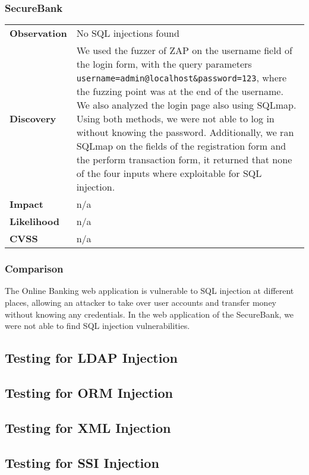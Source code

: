 \subsubsection*{SecureBank}

\begin{tabular}{l|p{10cm}}

\textbf{Observation} & No SQL injections found \\
\textbf{Discovery} & We used the fuzzer of ZAP on the username field of the login form, with the query parameters \texttt{username=admin@localhost\&password=123}, where the fuzzing point was at the end of the username. We also analyzed the login page also using SQLmap. Using both methods, we were not able to log in without knowing the password. Additionally, we ran SQLmap on the fields of the registration form and the perform transaction form, it returned that none of the four inputs where exploitable for SQL injection. \\
\textbf{Impact} & n/a \\
\textbf{Likelihood} & n/a \\
\textbf{CVSS} & n/a \\
\end{tabular}

\subsubsection*{Comparison}
The Online Banking web application is vulnerable to SQL injection at different places, allowing an attacker to take over user accounts and transfer money without knowing any credentials. In the web application of the SecureBank, we were not able to find SQL injection vulnerabilities.

\clearpage


\subsection{Testing for LDAP Injection}
\subsection{Testing for ORM Injection}
\subsection{Testing for XML Injection}
\subsection{Testing for SSI Injection}
